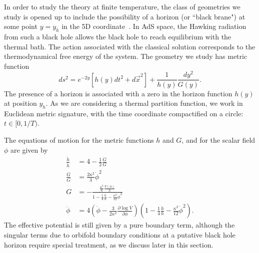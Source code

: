 \documentclass[12pt]{article}
\begin{document}
In order to study the theory at finite temperature, the class of geometries we study is opened up to include the possibility of a horizon (or ``black brane") at some point $y = y_h$ in the 5D coordinate~\cite{Hawking:1982dh,Witten:1998zw,Hebecker:2001nv}.  In AdS space, the Hawking radiation from such a black hole allows the black hole to reach equilibrium with the thermal bath.  The action associated with the classical solution corresponds to the thermodynamical free energy of the system.  The geometry we study has metric function
\begin{equation}
ds^2 = e^{-2y} \left[ h(y) dt^2 + d\vec{x}^2 \right] + \frac{1}{h(y)} \frac{dy^2}{G(y)}.
\end{equation}
The presence of a horizon is associated with a zero in the horizon function $h(y)$ at position $y_h$.  As we are considering a thermal partition function, we work in Euclidean metric signature, with the time coordinate compactified on a circle: $t \in [ 0,1/T )$.  

The equations of motion for the metric functions $h$ and $G$, and for the scalar field $\phi$ are given by
\begin{align}
 \frac{\ddot{h}}{\dot{h}} &= 4 -\frac{1}{2} \frac{\dot{G}}{G} \label{eq:hddot} \\
\frac{\dot{G}}{G} &= \frac{2 \kappa^2}{3} \dot{\phi}^2 \nonumber \\
G &= -\frac{ \frac{\kappa^2}{6} \frac{V(\phi)}{h}}{1 - \frac{1}{4} \frac{\dot{h}}{h} - \frac{\kappa^2}{12}\dot{\phi}^2} \\
\ddot{\phi} &= 4 \left( \dot{\phi} - \frac{3}{2\kappa^2} \frac{\partial \log V}{\partial \phi} \right) \left( 1-\frac{1}{4} \frac{\dot{h}}{h} -\frac{\kappa^2}{12} \dot{\phi}^2\right).
\end{align}
The effective potential is still given by a pure boundary term, although the singular terms due to orbifold boundary conditions at a putative black hole horizon require special treatment, as we discuss later in this section.  
\end{document}
